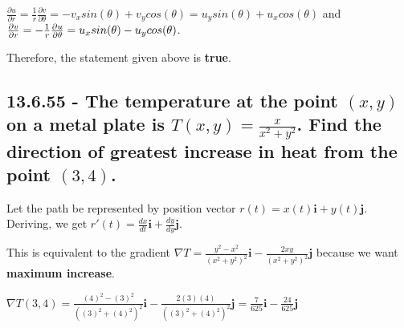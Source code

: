 \documentclass{article}
\begin{document}
\par\noindent\Large $\frac{\partial u}{\partial r} = \frac{1}{r}\frac{\partial v}{\partial\theta} = -v_{x}sin(\theta) + v_{y}cos(\theta) = u_{y}sin(\theta) + u_{x}cos(\theta)$ and $\frac{\partial v}{\partial r} = -\frac{1}{r}\frac{\partial u}{\partial\theta} = \linebreak u_{x}sin(\theta) - u_{y}cos(\theta)$.\vspace{0.25cm}

\par\noindent\large Therefore, the statement given above is \textbf{true}.

\par\noindent\Large 

\subsection{13.6.55 - The temperature at the point $(x, y)$ on a metal plate is $T(x, y) = \frac{x}{x^{2} + y^{2}}$.  Find the direction of greatest increase in heat from the point $(3, 4)$.}

\par\noindent\large Let the path be represented by position vector $r(t) = x(t)\textbf{i} + y(t)\textbf{j}$.  Deriving, we get $r'(t) = \frac{dx}{dt}\textbf{i} + \frac{dy}{dy}\textbf{j}$.  
\par\noindent\Large This is equivalent to the gradient $\nabla T = \frac{y^{2} - x^{2}}{(x^{2} + y^{2})^{2}}\textbf{i} - \frac{2xy}{(x^{2} + y^{2})^{2}}\textbf{j}$ because we want \textbf{maximum increase}.\vspace{0.25cm}

\par\noindent $\nabla T(3, 4) = \frac{(4)^{2} - (3)^{2}}{((3)^{2} + (4)^{2})^{2}}\textbf{i} - \frac{2(3)(4)}{((3)^{2} + (4)^{2})^{2}}\textbf{j} = \frac{7}{625}\textbf{i} - \frac{24}{625}\textbf{j}$
\end{document}
